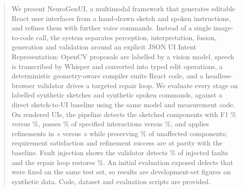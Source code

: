 \begin{abstract}
We present NeuroGenUI, a multimodal framework that generates editable React user interfaces from a hand-drawn sketch and spoken instructions, and refines them with further voice commands. Instead of a single image-to-code call, the system separates perception, interpretation, fusion, generation and validation around an explicit JSON UI Intent Representation: OpenCV proposals are labelled by a vision model, speech is transcribed by Whisper and converted into typed edit operations, a deterministic geometry-aware compiler emits React code, and a headless-browser validator drives a targeted repair loop. We evaluate every stage on \CountSketches{} labelled synthetic sketches and \CountCommands{} synthetic spoken commands, against a direct sketch-to-UI baseline using the same model and measurement code. On rendered UIs, the pipeline detects the sketched components with F1 \ComponentDetectionFODomPipeline{}\% versus \ComponentDetectionFODomBaseline{}\%, passes \FunctionalCorrectnessPipeline{}\% of specified interactions versus \FunctionalCorrectnessBaseline{}\%, and applies refinements in \ModificationTimeMsPipeline{}\,s versus \ModificationTimeMsBaseline{}\,s while preserving \PreservationRatePipeline{}\% of unaffected components; requirement satisfaction and refinement success are at parity with the baseline. Fault injection shows the validator detects \FaultDetectionRatePipeline{}\% of injected faults and the repair loop restores \FaultRepairRatePipeline{}\%. An initial evaluation exposed defects that were fixed on the same test set, so results are development-set figures on synthetic data. Code, dataset and evaluation scripts are provided.
\end{abstract}

